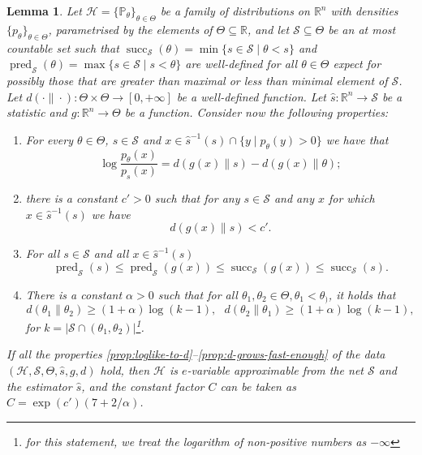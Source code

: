 \documentclass[10pt,a4paper]{amsart}
\newtheorem{lemma}{Lemma}
\newcommand{\probP}{\mathbb{P}}
\newcommand{\reals}{\mathbb{R}}
\begin{document}
\begin{lemma}\label{lem:4-cond-techn-lemma}
    Let $\mathcal{H} = \{\probP_\theta\}_{\theta\in\Theta}$ be a family of distributions on $\reals^n$ with densities $\{p_\theta\}_{\theta\in\Theta}$, parametrised by the elements of $\Theta\subseteq\reals$, and let $\mathcal{S} \subseteq \Theta$ be an at most countable set such that $\operatorname{succ}_{\mathcal{S}}(\theta)=\min\{s\in\mathcal{S}\mid\theta<s\}$ and $\operatorname{pred}_{\mathcal{S}}(\theta)=\max\{s\in\mathcal{S}\mid s<\theta\}$ are well-defined for all $\theta\in\Theta$ expect for possibly those that are greater than maximal or less than minimal element of $\mathcal{S}$. Let $d(\cdot\|\cdot):\Theta\times\Theta\to [0, +\infty]$ be a well-defined function. Let $\hat s:\reals^n\to \mathcal{S}$ be a statistic and $g:\reals^n\to\Theta$ be a function.
    Consider now the following properties:
    \begin{enumerate}[label=(p \roman*)]
        \item\label{prop:loglike-to-d} For every $\theta \in\Theta$, $s \in \mathcal{S}$ and $x\in \hat{s}^{-1}(s) \cap \{y\mid p_\theta(y)>0\}$ we have that
        \[
            \log\frac{p_\theta(x)}{p_{s}(x)} = d(g(x)\|s)-d(g(x)\|\theta);
        \]
        \item\label{prop:near-bound} there is a constant $c' > 0$ such that for any $s \in \mathcal{S}$ and any $x$ for which $x \in \hat s^{-1}(s)$ we have
        \[
            d(g(x)\|s) < c'.
        \]
        \item\label{prop:g-near-s} For all $s\in\mathcal{S}$ and all $x \in \hat s^{-1}(s)$
        \[
            \operatorname{pred}_{\mathcal{S}}(s)\le \operatorname{pred}_{\mathcal{S}}(g(x))\le \operatorname{succ}_{\mathcal{S}}(g(x))\le \operatorname{succ}_{\mathcal{S}}(s).
        \]
        \item\label{prop:d-grows-fast-enough} There is a constant $\alpha >0$ such that for all $\theta_1, \theta_2 \in \Theta, \theta_1 < \theta_)$, it holds that
        \[
            d(\theta_1\|\theta_2) \ge (1+\alpha)\log (k-1), ~~~ d(\theta_2\|\theta_1) \ge (1+\alpha)\log (k-1),
        \]
        for $k = \left| \mathcal{S} \cap (\theta_1, \theta_2) \right|$\footnote{for this statement, we treat the logarithm of non-positive numbers as $-\infty$}.
    \end{enumerate}

    If all the properties \ref{prop:loglike-to-d}--\ref{prop:d-grows-fast-enough} of the data $(\mathcal{H}, \mathcal{S}, \Theta, \hat{s}, g, d)$ hold, then $\mathcal{H}$ is $e$-variable approximable from the net $\mathcal{S}$ and the estimator $\hat s$, and the constant factor $C$ can be taken as $C =\exp(c')\left(7 +  2/\alpha\right)$.
\end{lemma}
\end{document}
